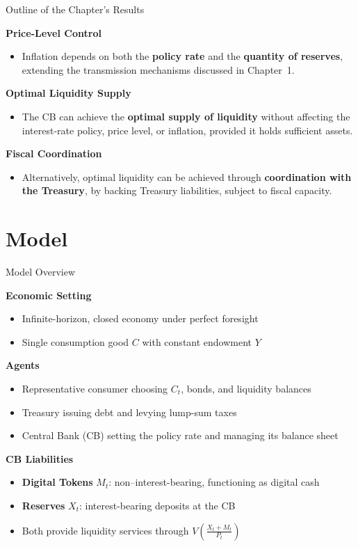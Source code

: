 \documentclass[11pt,aspectratio=169]{beamer}
\begin{document}
\begin{frame}{Outline of the Chapter’s Results}
\small

\textbf{Price-Level Control}  
\begin{itemize}
  \item Inflation depends on both the \textbf{policy rate} and the \textbf{quantity of reserves}, extending the transmission mechanisms discussed in Chapter~1.
\end{itemize}

\textbf{Optimal Liquidity Supply}  
\begin{itemize}
  \item The CB can achieve the \textbf{optimal supply of liquidity} without affecting the interest-rate policy, price level, or inflation, provided it holds sufficient assets.
\end{itemize}

\textbf{Fiscal Coordination} 
\begin{itemize} 
  \item Alternatively, optimal liquidity can be achieved through \textbf{coordination with the Treasury}, by backing Treasury liabilities, subject to fiscal capacity.
\end{itemize}

\end{frame}


\section{Model}

\begin{frame}{Model Overview}
\small

\textbf{Economic Setting}
\begin{itemize}
  \item Infinite-horizon, closed economy under perfect foresight
  \item Single consumption good $C$ with constant endowment $Y$
\end{itemize}

\textbf{Agents}
\begin{itemize}
  \item Representative consumer choosing $C_t$, bonds, and liquidity balances
  \item Treasury issuing debt and levying lump-sum taxes
  \item Central Bank (CB) setting the policy rate and managing its balance sheet
\end{itemize}

\textbf{CB Liabilities}
\begin{itemize}
  \item \textbf{Digital Tokens} $M_t$: non–interest-bearing, functioning as digital cash
  \item \textbf{Reserves} $X_t$: interest-bearing deposits at the CB
  \item Both provide liquidity services through $V\!\left(\tfrac{X_t + M_t}{P_t}\right)$
\end{itemize}

\end{frame}
\end{document}
